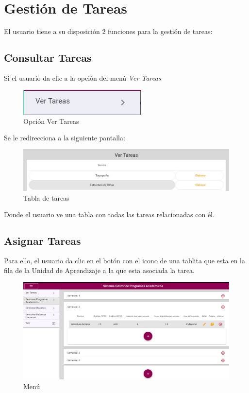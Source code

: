 \section{Gestión de Tareas}
    El usuario tiene a su disposición 2 funciones para la gestión de tareas:
    \subsection{Consultar Tareas}

        Si el usuario da clic a la opción del menú \textit{Ver Tareas}

        \begin{figure}[H]
            \centering
            \hypertarget{VERT}{\includegraphics[width=0.7\linewidth]{images/Tareas/Vertareaboton}}
            \caption{Opción Ver Tareas}
            \label{VERT}
        \end{figure}

        Se le redirecciona a la siguiente pantalla:
        \begin{figure}[H]
            \centering
            \hypertarget{asignart}{\includegraphics[width=0.7\linewidth]{images/Tareas/Vertareas}}
            \caption{Tabla de tareas}
            \label{asignart}
        \end{figure}
        Donde el usuario ve una tabla con todas las tareas relacionadas con él.



    \subsection{Asignar Tareas}

        Para ello, el usuario da clic en el botón con el icono de una tablita que esta en la fila de la Unidad de Aprendizaje a la que esta asociada la tarea.


        \begin{figure}[H]
            \centering
            \hypertarget{menu}{\includegraphics[width=0.7\linewidth]{images/Tareas/Menu}}
            \caption{Menú}
            \label{menu}
        \end{figure}


